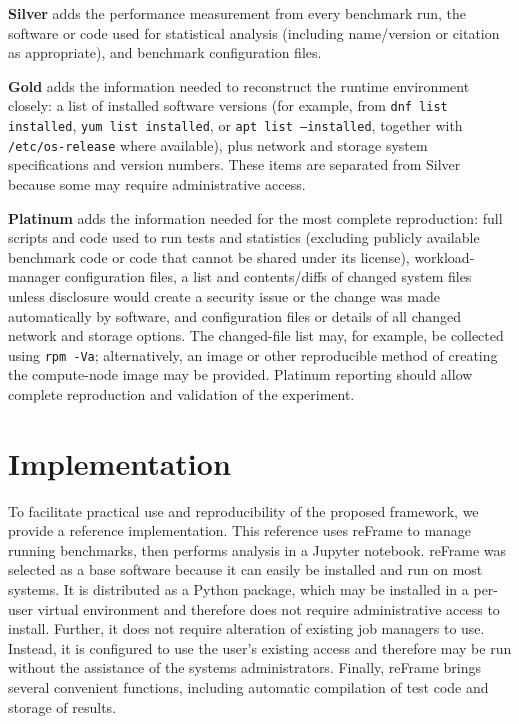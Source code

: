\documentclass[conference]{IEEEtran}
\begin{document}
\textbf{Silver} adds the performance measurement from every benchmark run, the software or code used for statistical analysis (including name/version or citation as appropriate), and benchmark configuration files.

\textbf{Gold} adds the information needed to reconstruct the runtime environment closely: a list of installed software versions (for example, from \texttt{dnf list installed}, \texttt{yum list installed}, or \texttt{apt list --installed}, together with \texttt{/etc/os-release} where available), plus network and storage system specifications and version numbers. These items are separated from Silver because some may require administrative access.

\textbf{Platinum} adds the information needed for the most complete reproduction: full scripts and code used to run tests and statistics (excluding publicly available benchmark code or code that cannot be shared under its license), workload-manager configuration files, a list and contents/diffs of changed system files unless disclosure would create a security issue or the change was made automatically by software, and configuration files or details of all changed network and storage options. The changed-file list may, for example, be collected using \texttt{rpm -Va}; alternatively, an image or other reproducible method of creating the compute-node image may be provided. Platinum reporting should allow complete reproduction and validation of the experiment.

\section{Implementation} \label{implementation}

To facilitate practical use and reproducibility of the proposed framework, we 
provide a reference implementation\cite{HPCNexusLabImpactofMonitoringonHPCWorkloads}. This reference uses 
reFrame\cite{karakasisRegressionFrameworkChecking} to manage running benchmarks,
then performs analysis in a Jupyter notebook.
reFrame was selected as a base software because it can easily be installed and 
run on most systems. It is 
distributed as a Python package, which may be installed in a per-user virtual environment 
and therefore does not require administrative access to install. Further, it 
does not require alteration of existing job managers to use. Instead, it is 
configured to use the user's existing access and therefore may be run without 
the assistance of the systems administrators. Finally, reFrame brings several 
convenient functions, including automatic compilation of test code and storage 
of results.
\end{document}
